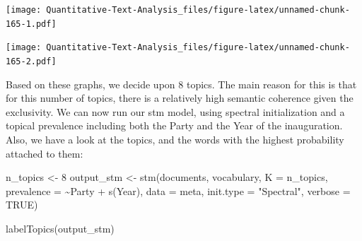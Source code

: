 \documentclass[
]{book}
\newenvironment{Shaded}{\begin{snugshade}}{\end{snugshade}}
\newcommand{\AttributeTok}[1]{\textcolor[rgb]{0.77,0.63,0.00}{#1}}
\newcommand{\ConstantTok}[1]{\textcolor[rgb]{0.00,0.00,0.00}{#1}}
\newcommand{\DecValTok}[1]{\textcolor[rgb]{0.00,0.00,0.81}{#1}}
\newcommand{\FunctionTok}[1]{\textcolor[rgb]{0.00,0.00,0.00}{#1}}
\newcommand{\NormalTok}[1]{#1}
\newcommand{\OtherTok}[1]{\textcolor[rgb]{0.56,0.35,0.01}{#1}}
\newcommand{\SpecialCharTok}[1]{\textcolor[rgb]{0.00,0.00,0.00}{#1}}
\newcommand{\StringTok}[1]{\textcolor[rgb]{0.31,0.60,0.02}{#1}}
\begin{document}
\texttt{[image: Quantitative-Text-Analysis\_files/figure-latex/unnamed-chunk-165-1.pdf]}

\begin{Shaded}
\end{Shaded}

\texttt{[image: Quantitative-Text-Analysis\_files/figure-latex/unnamed-chunk-165-2.pdf]}

Based on these graphs, we decide upon 8 topics. The main reason for this is that for this number of topics, there is a relatively high semantic coherence given the exclusivity. We can now run our stm model, using spectral initialization and a topical prevalence including both the Party and the Year of the inauguration. Also, we have a look at the topics, and the words with the highest probability attached to them:

\begin{Shaded}
\begin{Highlighting}[]
\NormalTok{n\_topics }\OtherTok{\textless{}{-}} \DecValTok{8}
\NormalTok{output\_stm }\OtherTok{\textless{}{-}} \FunctionTok{stm}\NormalTok{(documents, vocabulary, }\AttributeTok{K =}\NormalTok{ n\_topics, }\AttributeTok{prevalence =} \SpecialCharTok{\textasciitilde{}}\NormalTok{Party }\SpecialCharTok{+}
    \FunctionTok{s}\NormalTok{(Year), }\AttributeTok{data =}\NormalTok{ meta, }\AttributeTok{init.type =} \StringTok{"Spectral"}\NormalTok{, }\AttributeTok{verbose =} \ConstantTok{TRUE}\NormalTok{)}
\end{Highlighting}
\end{Shaded}

\begin{Shaded}
\begin{Highlighting}[]
\FunctionTok{labelTopics}\NormalTok{(output\_stm)}
\end{Highlighting}
\end{Shaded}
\end{document}
